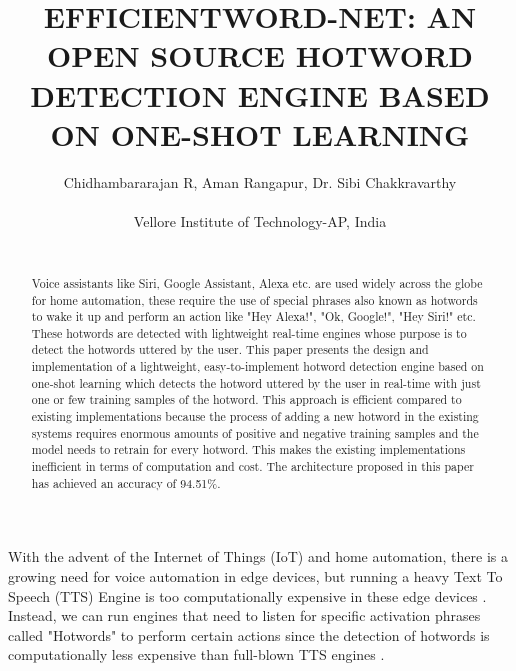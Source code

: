 \documentclass[10pt,twocolumn]{article}
\begin{document}
\title{EFFICIENTWORD-NET: AN OPEN SOURCE HOTWORD DETECTION ENGINE BASED ON ONE-SHOT LEARNING}

\author{Chidhambararajan R, Aman Rangapur, Dr. Sibi Chakkravarthy \\
\\
Vellore Institute of Technology-AP, India \\
\\
}



\maketitle
\thispagestyle{empty}

\begin{abstract}
Voice assistants like Siri, Google Assistant, Alexa etc. are used widely across the globe for home automation, these require the use of special phrases also known as hotwords to wake it up and perform an action like "Hey Alexa!", "Ok, Google!", "Hey Siri!" etc. These hotwords are detected with lightweight real-time engines whose purpose is to detect the hotwords uttered by the user. This paper presents the design and implementation of a lightweight, easy-to-implement hotword detection engine based on one-shot learning which detects the hotword uttered by the user in real-time with just one or few training samples of the hotword. This approach is efficient compared to existing implementations because the process of adding a new hotword in the existing systems requires enormous amounts of positive and negative training samples and the model needs to retrain for every hotword. This makes the existing implementations inefficient in terms of computation and cost. The architecture proposed in this paper has achieved an accuracy of 94.51\%.
\end{abstract}


With the advent of the Internet of Things (IoT) and home automation, there is a growing need for voice automation in edge devices, but running a heavy Text To Speech (TTS) Engine is too computationally expensive in these edge devices \cite{amodei2015deep}. Instead, we can run engines that need to listen for specific activation phrases called "Hotwords" to perform certain actions since the detection of hotwords is computationally less expensive than full-blown TTS engines \cite{Yang_Jee_Leblanc_Weaver_Armand_2020}.
\end{document}
